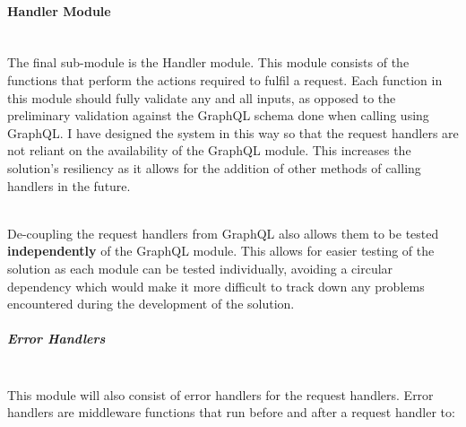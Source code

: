 \documentclass[../../main.tex]{subfiles}
\begin{document}
\paragraph{Handler Module\\}

\noindent \\ The final sub-module is the Handler module. This module consists of
the functions that perform the actions required to fulfil a request.
Each function in this module should fully validate any and all inputs, as opposed
to the preliminary validation against the GraphQL schema done when calling using GraphQL.
I have designed the system in this way so that the request handlers are not reliant
on the availability of the GraphQL module. This increases the solution's resiliency
as it allows for the addition of other methods of calling handlers in the future.

\noindent \\ De-coupling the request handlers from GraphQL also allows them to be
tested \textbf{independently} of the GraphQL module. This allows for easier
testing of the solution as each module can be tested individually,  avoiding
a circular dependency which would make it more difficult to track down any problems
encountered during the development of the solution.

\subparagraph{Error Handlers\\}

\noindent \\ This module will also consist of error handlers for the request handlers.
Error handlers are middleware functions that run before and after a request handler to:
\end{document}
